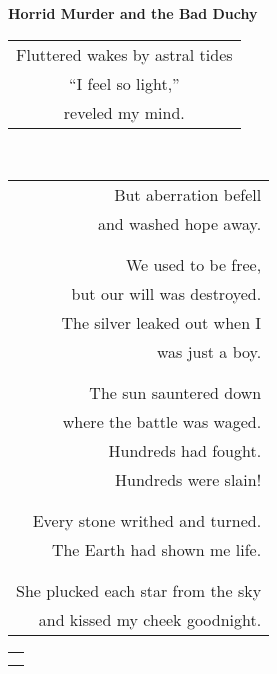 \documentclass{article}
\begin{document}
\begin{center}
\textbf{Horrid Murder and the Bad Duchy} \\
\begin{tabular}{c}
\\
Fluttered wakes by astral tides \\
``I feel so light,'' \\
reveled my mind. \\
\end{tabular} \\
\begin{tabular}{r}
\\
But aberration befell \\
and washed hope away. \\
\\
\\
We used to be free, \\
but our will\hspace{2ex} was destroyed. \\
The silver leaked out\hspace{2ex} when I \\
was just a boy. \\
\\
\\
The sun sauntered down \\
where the battle was waged. \\
Hundreds had fought. \\
Hundreds were slain! \\
\\
\\
Every stone writhed and turned. \\
The Earth had shown me life. \\
\\
\\
She plucked each star from the sky \\
and kissed my cheek goodnight. \\
\end{tabular}
\begin{tabular}{l}
\\
\\
\\

\end{tabular}
\end{center}
\end{document}
